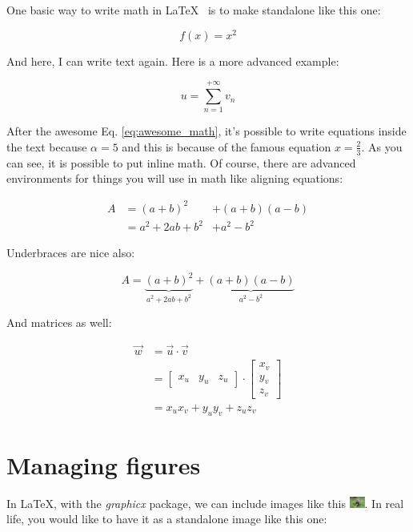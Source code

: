 \documentclass[10pt,a4paper,twoside]{article}
\begin{document}
One basic way to write math in \LaTeX~ is to make standalone like this one:

$$
  f(x) = x^2
$$

\noindent And here, I can write text again.
Here is a more advanced example:

\begin{equation}
  u = \sum_{n=1}^{+\infty} v_n
  \label{eq:awesome_math}
\end{equation}

\noindent After the awesome Eq. \ref{eq:awesome_math}, it's possible to write equations inside the text because $\alpha = 5$ and this is because of the famous equation $x = \frac{2}{3}$.
As you can see, it is possible to put inline math.
Of course, there are advanced environments for things you will use in math like aligning equations:

\begin{align}
  A & = (a+b)^2        & + (a+b)(a-b)\nonumber \\
    & = a^2 + 2ab +b^2 & + a^2 - b^2
\end{align}

\noindent Underbraces are nice also:

\begin{equation}
  A = \underbrace{(a+b)^2}_{a^2 + 2ab +b^2}
  + \underbrace{(a+b)(a-b)}_{a^2 - b^2}
\end{equation}

\noindent And matrices as well:

\begin{align}
  \vec w & = \vec u \cdot \vec v         \\
         & =
  \begin{bmatrix}
    x_u & y_u & z_u
  \end{bmatrix}
  \cdot
  \begin{bmatrix}
    x_v \\ y_v \\ z_v
  \end{bmatrix}              \\
         & = x_u x_v + y_u y_v + z_u z_v
\end{align}


\section{Managing figures}

In \LaTeX, with the \textit{graphicx} package, we can include images like this \includegraphics[width = 0.5cm]{figures/ragondin_small.jpg}.
In real life, you would like to have it as a standalone image like this one:
\end{document}
